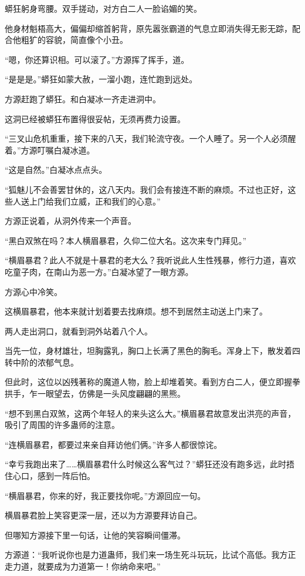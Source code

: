 \begin{this_body}
蟒狂躬身弯腰。双手搓动，对方白二人一脸谄媚的笑。

他身材魁梧高大，偏偏却缩首躬背，原先嚣张霸道的气息立即消失得无影无踪，配合他粗犷的容貌，简直像个小丑。

“嗯，你还算识相。可以滚了。”方源挥了挥手，道。

“是是是。”蟒狂如蒙大赦，一溜小跑，连忙跑到远处。

方源赶跑了蟒狂。和白凝冰一齐走进洞中。

这洞已经被蟒狂布置得很妥帖，无须再费力设置。

“三叉山危机重重，接下来的八天，我们轮流守夜。一个人睡了。另一个人必须醒着。”方源叮嘱白凝冰道。

“这是自然。”白凝冰点点头。

“狐魅儿不会善罢甘休的，这八天内。我们会有接连不断的麻烦。不过也正好，这些人送上门给我们立威，正和我们的心意。”

方源正说着，从洞外传来一个声音。

“黑白双煞在吗？本人横眉暴君，久仰二位大名。这次来专门拜见。”

“横眉暴君？此人不就是十暴君的老大么？我听说此人生性残暴，修行力道，喜欢吃童子肉，在南山为恶一方。”白凝冰望了一眼方源。

方源心中冷笑。

这横眉暴君，他本来就计划着要去找麻烦。想不到居然主动送上门来了。

两人走出洞口，就看到洞外站着八个人。

当先一位，身材雄壮，坦胸露乳，胸口上长满了黑色的胸毛。浑身上下，散发着四转中阶的浓郁气息。

但此时，这位以凶残著称的魔道人物，脸上却堆着笑。看到方白二人，便立即握拳拱手，乍一眼望去，仿佛是一头风度翩翩的黑熊。

“想不到黑白双煞，这两个年轻人的来头这么大。”横眉暴君故意发出洪亮的声音，吸引了周围的许多蛊师的注意。

“连横眉暴君，都要过来亲自拜访他们俩。”许多人都很惊诧。

“幸亏我跑出来了……横眉暴君什么时候这么客气过？”蟒狂还没有跑多远，此时捂住心口，感到一阵后怕。

“横眉暴君，你来的好，我正要找你呢。”方源回应一句。

横眉暴君脸上笑容更深一层，还以为方源要拜访自己。

但哪知方源接下里一句话，让他的笑容瞬间僵滞。

方源道：“我听说你也是力道蛊师，我们来一场生死斗玩玩，比试个高低。我方正走力道，就要成为力道第一！你纳命来吧。”


\end{this_body}
